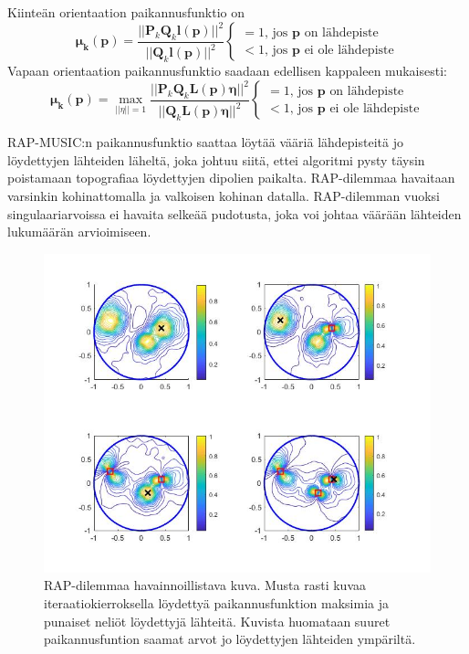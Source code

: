 Kiinteän orientaation paikannusfunktio on
\begin{equation}
    \mathbf{\mu_k(p)} = \frac{||\mathbf{P}_k\mathbf{Q}_k\mathbf{l(p)}||^2}{||\mathbf{Q}_k\mathbf{l(p)}||^2}
    \begin{cases}
    =1\text{, jos $\mathbf{p}$ on lähdepiste}\\
    <1\text{, jos $\mathbf{p}$ ei ole lähdepiste}
     \end{cases}
\end{equation}
Vapaan orientaation paikannusfunktio saadaan edellisen kappaleen mukaisesti:
\begin{equation}
    \mathbf{\mu_k(p)} = \max_{||\eta||=1} \frac{||\mathbf{P}_k\mathbf{Q}_k\mathbf{L(p)\eta}||^2}{||\mathbf{Q}_k\mathbf{L(p)\eta}||^2}
    \begin{cases}
    =1\text{, jos $\mathbf{p}$ on lähdepiste}\\
    <1\text{, jos $\mathbf{p}$ ei ole lähdepiste}
     \end{cases}
\end{equation}

RAP-MUSIC:n paikannusfunktio saattaa löytää vääriä lähdepisteitä jo löydettyjen lähteiden läheltä, joka johtuu siitä, ettei algoritmi pysty täysin poistamaan topografiaa löydettyjen dipolien paikalta. RAP-dilemmaa havaitaan varsinkin kohinattomalla ja valkoisen kohinan datalla. RAP-dilemman vuoksi singulaariarvoissa ei havaita selkeää pudotusta, joka voi johtaa väärään lähteiden lukumäärän arvioimiseen. \citep{Makela2018TruncatedLocalization}

\begin{figure}[hb]
    \centering
    \includegraphics[width=\textwidth]{rapdilemma.jpg}
    \caption{RAP-dilemmaa havainnoillistava kuva. Musta rasti kuvaa iteraatiokierroksella löydettyä paikannusfunktion maksimia ja punaiset neliöt löydettyjä lähteitä. Kuvista huomataan suuret paikannusfuntion saamat arvot jo löydettyjen lähteiden ympäriltä.}
    \label{fig:dilemma}
\end{figure}